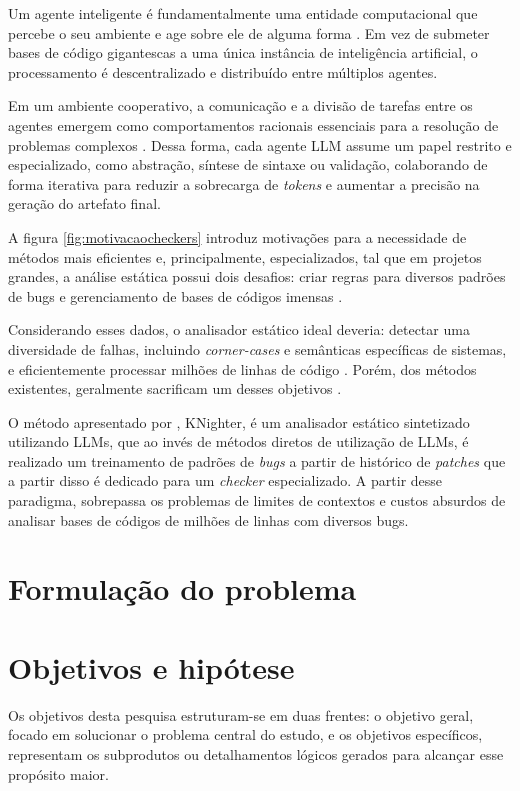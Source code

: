 \documentclass[
    12pt,                %
    openright,           %
    oneside,             %
    a4paper,             %
    english,             %
    brazil               %
]{abntex2}
\begin{document}
Um agente inteligente é fundamentalmente uma entidade computacional que percebe o seu ambiente e age sobre ele de alguma forma \cite{russell2020artificial}.
Em vez de submeter bases de código gigantescas a uma única instância de inteligência artificial, o processamento é descentralizado e distribuído entre múltiplos agentes.
\par
Em um ambiente cooperativo, a comunicação e a divisão de tarefas entre os agentes emergem como comportamentos racionais essenciais para a resolução de problemas complexos \cite{russell2020artificial}.
Dessa forma, cada agente LLM assume um papel restrito e especializado, como abstração, síntese de sintaxe ou validação, colaborando de forma iterativa para reduzir a sobrecarga de \textit{tokens} e aumentar a precisão na geração do artefato final.
\par
A figura \ref{fig:motivacaocheckers} introduz motivações para a necessidade de métodos mais eficientes e, principalmente, especializados, tal que em projetos grandes, a análise estática possui dois desafios: criar regras para diversos padrões de bugs e gerenciamento de bases de códigos imensas \cite{yang2025knighter}.
\par
Considerando esses dados, o analisador estático ideal deveria: detectar uma diversidade de falhas, incluindo \textit{corner-cases} e semânticas específicas de sistemas, e eficientemente processar milhões de linhas de código \cite{yang2025knighter}.
Porém, dos métodos existentes, geralmente sacrificam um desses objetivos \cite{yang2025knighter}.
\par
O método apresentado por , KNighter, é um analisador estático sintetizado utilizando LLMs, que ao invés de métodos diretos de utilização de LLMs, é realizado um treinamento de padrões de \textit{bugs} a partir de histórico de \textit{patches} que a partir disso é dedicado para um \textit{checker} especializado.
A partir desse paradigma,  sobrepassa os problemas de limites de contextos e custos absurdos de analisar bases de códigos de milhões de linhas com diversos bugs.

\section{Formulação do problema}
\label{sec:problema}

\section{Objetivos e hipótese}
\label{sec:objetivos}
\par
Os objetivos desta pesquisa estruturam-se em duas frentes: o objetivo geral, focado em solucionar o problema central do estudo, e os objetivos específicos, representam os subprodutos ou detalhamentos lógicos gerados para alcançar esse propósito maior.
\end{document}

